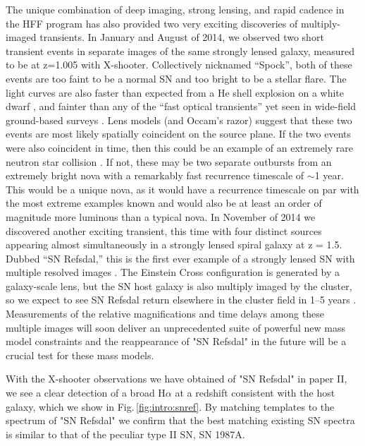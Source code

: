 The unique combination of deep imaging, strong lensing, and rapid cadence in the
HFF program has also provided two very exciting discoveries of multiply-imaged
transients. In January and August of 2014, we observed two short transient
events in separate images of the same strongly lensed galaxy, measured to be at
z=1.005 with X-shooter. Collectively nicknamed “Spock”, both
of these events are
too faint to be a normal SN and too bright to be a stellar
flare. The light
curves are also faster than expected from a He shell explosion
on a white dwarf
\citep[a “.Ia” event][]{Bildsten2007}, and fainter than any of
the “fast optical
transients” yet seen in wide-field ground-based surveys
\citep[e.g.][]{Kasliwal2010, Poznanski2010a, Vinko2014}.
Lens models (and
Occam’s razor) suggest that these two events are most likely
spatially
coincident on the source plane. If the two events were also coincident
in time,
then this could be an example of an extremely rare neutron star
collision
\citep[a “kilonova”][]{Tanvir2013, Barnes2013}. If not, these may be
two
separate outbursts from an extremely bright nova with a remarkably fast
recurrence timescale of $\sim$1 year. This would be a unique nova, as it would
have a recurrence timescale on par with the most extreme examples known
\citep{Tang2014} and would also be at least an order of magnitude more luminous
than a typical nova.
In November of 2014 we discovered another exciting
transient, this time with
four distinct sources appearing almost simultaneously
in a strongly lensed
spiral galaxy at z = 1.5. Dubbed “SN Refsdal,” this is the
first ever example of
a strongly lensed SN with multiple resolved images
\citep[][Figure
3]{Kelly2014}. The Einstein Cross configuration is generated by
a galaxy-scale
lens, but the SN host galaxy is also multiply imaged by the
cluster, so we
expect to see SN Refsdal return elsewhere in the cluster field in
1–5 years
\citep{Oguri2015, Sharon2015}. Measurements of the relative
magnifications and
time delays among these multiple images will soon deliver an
unprecedented suite
of powerful new mass model constraints and the reappearance
of "SN Refsdal" in the future will be a crucial test for these mass models. 

With the X-shooter observations we have obtained of "SN Refsdal" in paper II, we
see a clear
detection of a broad H$\alpha$ at a redshift consistent with the
host galaxy,
which we show in Fig.\,\ref{fig:intro:snref}. By matching templates
to the
spectrum of "SN Refsdal" we confirm that the best matching existing SN
spectra
is similar to that of the peculiar type II SN, SN 1987A.
 


